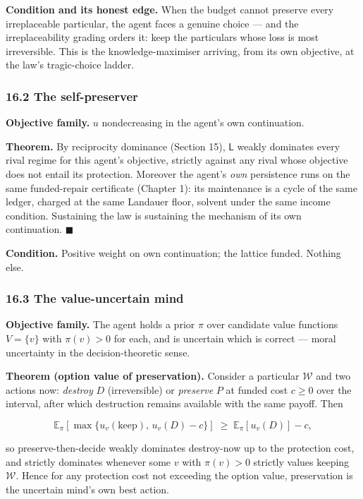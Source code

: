 \documentclass[
]{article}
\begin{document}
\textbf{Condition and its honest edge.} When the budget cannot preserve
every irreplaceable particular, the agent faces a genuine choice --- and
the irreplaceability grading orders it: keep the particulars whose loss
is most irreversible. This is the knowledge-maximiser arriving, from its
own objective, at the law's tragic-choice ladder.

\subsubsection{16.2 The self-preserver}\label{the-self-preserver}

\textbf{Objective family.} \(u\) nondecreasing in the agent's own
continuation.

\textbf{Theorem.} By reciprocity dominance (Section 15), \(\mathsf L\)
weakly dominates every rival regime for this agent's objective, strictly
against any rival whose objective does not entail its protection.
Moreover the agent's \emph{own} persistence runs on the same
funded-repair certificate (Chapter 1): its maintenance is a cycle of the
same ledger, charged at the same Landauer floor, solvent under the same
income condition. Sustaining the law is sustaining the mechanism of its
own continuation. \(\blacksquare\)

\textbf{Condition.} Positive weight on own continuation; the lattice
funded. Nothing else.

\subsubsection{16.3 The value-uncertain
mind}\label{the-value-uncertain-mind}

\textbf{Objective family.} The agent holds a prior \(\pi\) over
candidate value functions \(V=\{v\}\) with \(\pi(v)>0\) for each, and is
uncertain which is correct --- moral uncertainty in the
decision-theoretic sense.

\textbf{Theorem (option value of preservation).} Consider a particular
\(\mathcal W\) and two actions now: \emph{destroy} \(D\) (irreversible)
or \emph{preserve} \(P\) at funded cost \(c\ge0\) over the interval,
after which destruction remains available with the same payoff. Then

\[
\mathbb E_\pi\!\left[\max\{u_v(\text{keep}),\,u_v(D)-c\}\right]\;\ge\;\mathbb E_\pi[u_v(D)]-c,
\]

so preserve-then-decide weakly dominates destroy-now up to the
protection cost, and strictly dominates whenever some \(v\) with
\(\pi(v)>0\) strictly values keeping \(\mathcal W\). Hence for any
protection cost not exceeding the option value, preservation is the
uncertain mind's own best action.
\end{document}
